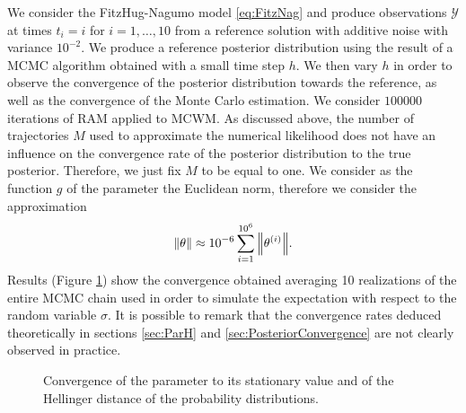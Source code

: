 We consider the FitzHug-Nagumo model \eqref{eq:FitzNag} and produce observations $\mathcal{Y}$ at times $t_i = i$ for $i = 1, \ldots, 10$ from a reference solution with additive noise with variance $10^{-2}$. We produce a reference posterior distribution using the result of a MCMC algorithm obtained with a small time step $h$. We then vary $h$ in order to observe the convergence of the posterior distribution towards the reference, as well as the convergence of the Monte Carlo estimation. We consider $100000$ iterations of RAM applied to MCWM. As discussed above, the number of trajectories $M$ used to approximate the numerical likelihood does not have an influence on the convergence rate of the posterior distribution to the true posterior. Therefore, we just fix $M$ to be equal to one. We consider as the function $g$ of the parameter the Euclidean norm, therefore we consider the approximation
\begin{equation}
	\norm{\theta} \approx 10^{-6} \sum_{i = 1}^{10^6} \norm{\theta^{(i)}}.
\end{equation}
Results	(Figure \ref{fig:ConvergenceMCMC}) show the convergence obtained averaging 10 realizations of the entire MCMC chain used in order to simulate the expectation with respect to the random variable $\sigma$. It is possible to remark that the convergence rates deduced theoretically in sections \ref{sec:ParH} and \ref{sec:PosteriorConvergence} are not clearly observed in practice.

\begin{figure}[t]
	\centering
	\begin{subfigure}{0.49\linewidth}
		\centering
		\resizebox{1.0\linewidth}{!}{}
	\end{subfigure}
	\begin{subfigure}{0.49\linewidth}
		\centering
		\resizebox{1.0\linewidth}{!}{}
	\end{subfigure}
	\caption{Convergence of the parameter to its stationary value and of the Hellinger distance of the probability distributions.}
	\label{fig:ConvergenceMCMC}
\end{figure}


